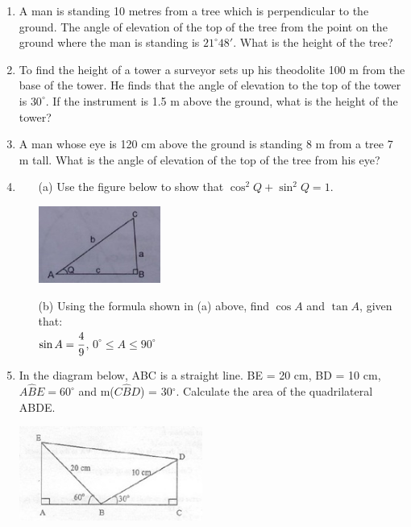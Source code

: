 \begin{enumerate}
	\item A man is standing 10 metres from a tree which is perpendicular to the ground. The angle of elevation of the top of the tree from the point on the ground where the man is standing is $21^\circ 48'$. What is the height of the tree?
	
	\item To find the height of a tower a surveyor sets up his theodolite 100 m from the base of the tower. He finds that the angle of elevation to the top of the tower is $30^\circ$. If the instrument is 1.5 m above the ground, what is the height of the tower?
	
	\item A man whose eye is 120 cm above the ground is standing 8 m from a tree 7 m tall. What is the angle of elevation of the top of the tree from his eye?
	
	
	\item 
		\begin{itemize}
		\item[(a)] Use the figure below to show that $\cos^2 Q + \sin^2 Q = 1$.
	\begin{center}
	\includegraphics[width=4cm]{./img/trig4.jpg}
	\end{center}
		\item[(b)] Using the formula shown in (a) above, find $\cos A$ and $\tan A$, given that:\\
		$\sin A = \cfrac{4}{9}$, $0^\circ \leq A \leq 90^\circ$
		\end{itemize}
		
		
	\item In the diagram below, ABC is a straight line. BE = 20 cm, BD = 10 cm, $A\hat{B}E = 60^\circ$ and m($C\hat{B}D$) = 30$^\circ$. Calculate the area of the quadrilateral ABDE.
	\begin{center}
	\includegraphics[width=6cm]{./img/trig1.jpg}
	\end{center}	
		

\end{enumerate}
